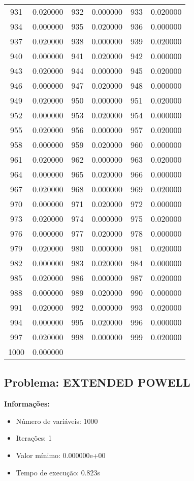 \documentclass[12pt]{article}
\begin{document}
\begin{longtable}{@{}cc|cc|cc@{}}
931 & 0.020000 & 932 & 0.000000 & 933 & 0.020000 \\
934 & 0.000000 & 935 & 0.020000 & 936 & 0.000000 \\
937 & 0.020000 & 938 & 0.000000 & 939 & 0.020000 \\
940 & 0.000000 & 941 & 0.020000 & 942 & 0.000000 \\
943 & 0.020000 & 944 & 0.000000 & 945 & 0.020000 \\
946 & 0.000000 & 947 & 0.020000 & 948 & 0.000000 \\
949 & 0.020000 & 950 & 0.000000 & 951 & 0.020000 \\
952 & 0.000000 & 953 & 0.020000 & 954 & 0.000000 \\
955 & 0.020000 & 956 & 0.000000 & 957 & 0.020000 \\
958 & 0.000000 & 959 & 0.020000 & 960 & 0.000000 \\
961 & 0.020000 & 962 & 0.000000 & 963 & 0.020000 \\
964 & 0.000000 & 965 & 0.020000 & 966 & 0.000000 \\
967 & 0.020000 & 968 & 0.000000 & 969 & 0.020000 \\
970 & 0.000000 & 971 & 0.020000 & 972 & 0.000000 \\
973 & 0.020000 & 974 & 0.000000 & 975 & 0.020000 \\
976 & 0.000000 & 977 & 0.020000 & 978 & 0.000000 \\
979 & 0.020000 & 980 & 0.000000 & 981 & 0.020000 \\
982 & 0.000000 & 983 & 0.020000 & 984 & 0.000000 \\
985 & 0.020000 & 986 & 0.000000 & 987 & 0.020000 \\
988 & 0.000000 & 989 & 0.020000 & 990 & 0.000000 \\
991 & 0.020000 & 992 & 0.000000 & 993 & 0.020000 \\
994 & 0.000000 & 995 & 0.020000 & 996 & 0.000000 \\
997 & 0.020000 & 998 & 0.000000 & 999 & 0.020000 \\
1000 & 0.000000 &  &  &  &  \\

\end{longtable}


\newpage            
\subsection{Problema: EXTENDED POWELL}

\textbf{Informações:}
\begin{itemize}
\item Número de variáveis: 1000
\item Iterações: 1
\item Valor mínimo: 0.000000e+00
\item Tempo de execução: 0.823s
\end{itemize}
\end{document}
